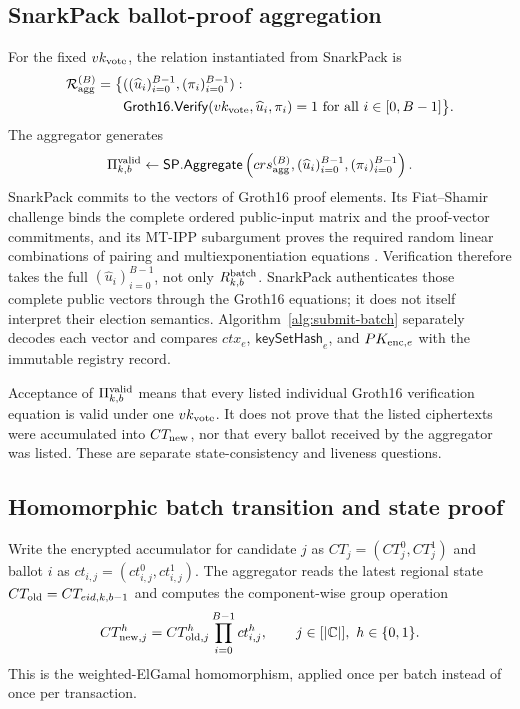 \documentclass[pdflatex,sn-mathphys-num]{sn-jnl}%
\theoremstyle{thmstyleone}%
\theoremstyle{thmstyletwo}%
\theoremstyle{thmstylethree}%
\begin{document}
\subsection{SnarkPack ballot-proof aggregation}\label{subsec:batch-validity}

For the fixed $vk_{\rm vote}$, the relation instantiated from SnarkPack is
\[
\begin{aligned}
 \mathcal{R}_{\rm agg}^{(B)}=\big\{&
  ((\widehat u_i)_{i=0}^{B-1},(\pi_i)_{i=0}^{B-1}):\\
 &\mathsf{Groth16.Verify}(vk_{\rm vote},\widehat u_i,\pi_i)=1
  \ \text{for all }i\in[0,B-1]\big\}.
\end{aligned}
\]
The aggregator generates
\[
 \Pi^{\rm valid}_{k,b}\leftarrow
 \mathsf{SP.Aggregate}\left(crs_{\rm agg}^{(B)},
 (\widehat u_i)_{i=0}^{B-1},(\pi_i)_{i=0}^{B-1}\right).
\]
SnarkPack commits to the vectors of Groth16 proof elements. Its Fiat--Shamir challenge binds the complete ordered public-input matrix and the proof-vector commitments, and its MT-IPP subargument proves the required random linear combinations of pairing and multiexponentiation equations \cite{bib128}. Verification therefore takes the full $(\widehat u_i)_{i=0}^{B-1}$, not only $R^{\rm batch}_{k,b}$. SnarkPack authenticates those complete public vectors through the Groth16 equations; it does not itself interpret their election semantics. Algorithm~\ref{alg:submit-batch} separately decodes each vector and compares $ctx_e$, $\mathsf{keySetHash}_e$, and $PK_{{\rm enc},e}$ with the immutable registry record.

Acceptance of $\Pi^{\rm valid}_{k,b}$ means that every listed individual Groth16 verification equation is valid under one $vk_{\rm vote}$. It does not prove that the listed ciphertexts were accumulated into $CT_{\rm new}$, nor that every ballot received by the aggregator was listed. These are separate state-consistency and liveness questions.

\subsection{Homomorphic batch transition and state proof}\label{subsec:batch-state}

Write the encrypted accumulator for candidate $j$ as $CT_j=(CT_j^0,CT_j^1)$ and ballot $i$ as $ct_{i,j}=(ct_{i,j}^0,ct_{i,j}^1)$. The aggregator reads the latest regional state $CT_{\rm old}=CT_{eid,k,b-1}$ and computes the component-wise group operation
\[
 CT_{{\rm new},j}^{h}=CT_{{\rm old},j}^{h}
 \prod_{i=0}^{B-1}ct_{i,j}^{h},
 \qquad j\in[|\mathbb C|],\ h\in\{0,1\}.
\]
This is the weighted-ElGamal homomorphism, applied once per batch instead of once per transaction.
\end{document}

